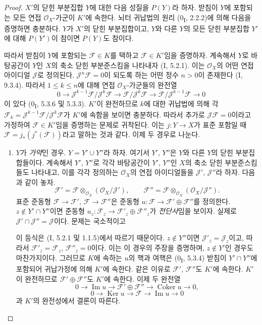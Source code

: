 \begin{proof}
$X'$의 닫힌 부분집합 $Y$에 대한 다음 성질을 $P(Y)$라 하자. 받침이
$Y$에 포함되는 모든 연접 $\mathcal O_X$-가군이 $K'$에 속한다.
뇌터 귀납법의 원리 (0\textsubscript{I}, 2.2.2)에 의해 다음을
증명하면 충분하다. $Y$가 $X'$의 닫힌 부분집합이고, $Y$와 다른
$Y$의 모든 닫힌 부분집합 $Y'$에 대해 $P(Y')$이 참이면 $P(Y)$도
참이다.

따라서 받침이 $Y$에 포함되는 $\mathcal F\in K$를 택하고
$\mathcal F\in K'$임을 증명하자. 계속해서 $Y$로 바탕공간이 $Y$인
$X$의 축소 닫힌 부분준스킴을 나타내자 (I, 5.2.1). 이는
$\mathcal O_X$의 어떤 연접 아이디얼 $\mathcal J$로 정의된다.
$\mathcal J^n\mathcal F=0$이 되도록 하는 어떤 정수 $n>0$이 존재한다
(I, 9.3.4). 따라서 $1\leq k\leq n$에 대해 연접
$\mathcal O_X$-가군들의 완전열
\[
0\longrightarrow
\mathcal J^{k-1}\mathcal F/\mathcal J^k\mathcal F
\longrightarrow \mathcal F/\mathcal J^k\mathcal F
\longrightarrow \mathcal F/\mathcal J^{k-1}\mathcal F
\longrightarrow0
\]
이 있다 (0\textsubscript{I}, 5.3.6 및 5.3.3). $K'$이 완전하므로
$k$에 대한 귀납법에 의해 각
$\mathcal F_k=\mathcal J^{k-1}\mathcal F/\mathcal J^k\mathcal F$가
$K'$에 속함을 보이면 충분하다. 따라서 추가로
$\mathcal J\mathcal F=0$이라고 가정하여 $\mathcal F\in K'$임을
증명하는 문제로 귀착된다. 이는 $j:Y\to X$가 표준 포함일 때
$\mathcal F=j_*(j^*(\mathcal F))$라고 말하는 것과 같다. 이제 두
경우로 나눈다.
\begin{enumerate}
\item[a)] $Y$가 \emph{가약}인 경우. $Y=Y'\cup Y''$라 하자. 여기서
$Y'$, $Y''$은 $Y$와 다른 $Y$의 닫힌 부분집합들이다. 계속해서
$Y'$, $Y''$로 각각 바탕공간이 $Y'$, $Y''$인 $X$의 축소 닫힌
부분준스킴들도 나타내고, 이를 각각 정의하는 $\mathcal O_X$의 연접
아이디얼들을 $\mathcal J'$, $\mathcal J''$라 하자. 다음과 같이 놓자.
\[
\mathcal F'=\mathcal F\otimes_{\mathcal O_X}
(\mathcal O_X/\mathcal J'),\qquad
\mathcal F''=\mathcal F\otimes_{\mathcal O_X}
(\mathcal O_X/\mathcal J'').
\]
표준 준동형 $\mathcal F\to\mathcal F'$,
$\mathcal F\to\mathcal F''$은 준동형
$u:\mathcal F\to\mathcal F'\oplus\mathcal F''$를 정의한다.
$z\notin Y'\cap Y''$이면 준동형
$u_z:\mathcal F_z\to\mathcal F'_z\oplus\mathcal F''_z$가
\emph{전단사}임을 보이자. 실제로
$\mathcal J'\cap\mathcal J''=\mathcal J$이다. 문제는 국소적이고

이 등식은 (I, 5.2.1 및 1.1.5)에서 따르기 때문이다. $z\notin Y''$이면
$\mathcal J'_z=\mathcal J_z$이고, 따라서
$\mathcal F'_z=\mathcal F_z$, $\mathcal F''_z=0$이다. 이는 이 경우의
주장을 증명하며, $z\notin Y'$인 경우도 마찬가지이다. 그러므로 $K$에
속하는 $u$의 핵과 여핵은 (0\textsubscript{I}, 5.3.4) 받침이
$Y'\cap Y''$에 포함되어 귀납가정에 의해 $K'$에 속한다. 같은 이유로
$\mathcal F'$, $\mathcal F''$도 $K'$에 속한다. $K'$이 완전하므로
$\mathcal F'\oplus\mathcal F''$도 $K'$에 속한다. 이제 두 완전열
\[
0\longrightarrow\operatorname{Im}u\longrightarrow
\mathcal F'\oplus\mathcal F''\longrightarrow
\operatorname{Coker}u\longrightarrow0,
\]
\[
0\longrightarrow\operatorname{Ker}u\longrightarrow\mathcal F
\longrightarrow\operatorname{Im}u\longrightarrow0
\]
과 $K'$의 완전성에서 결론이 따른다.


\end{enumerate}
\end{proof}
